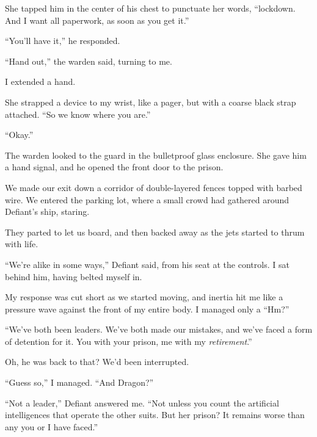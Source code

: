 She tapped him in the center of his chest to punctuate her words, ``\ldotsbefore lockdown.  And I want all paperwork, as soon as you get it.''



``You'll have it,'' he responded.



``Hand out,'' the warden said, turning to me.



I extended a hand.



She strapped a device to my wrist, like a pager, but with a coarse black strap attached.  ``So we know where you are.''



``Okay.''



The warden looked to the guard in the bulletproof glass enclosure.  She gave him a hand signal, and he opened the front door to the prison.



We made our exit down a corridor of double-layered fences topped with barbed wire.  We entered the parking lot, where a small crowd had gathered around Defiant's ship, staring.



They parted to let us board, and then backed away as the jets started to thrum with life.



``We're alike in some ways,'' Defiant said, from his seat at the controls.  I sat behind him, having belted myself in.



My response was cut short as we started moving, and inertia hit me like a pressure  wave against the front of my entire body.  I managed only a ``Hm?''



``We've both been leaders.  We've both made our mistakes, and we've faced a form of detention for it.  You with your prison, me with my \emph{retirement}.''



Oh, he was back to that?  We'd been interrupted.



``Guess so,'' I managed.  ``And Dragon?''



``Not a leader,'' Defiant answered me.  ``Not unless you count the artificial intelligences that operate the other suits.  But her prison?  It remains worse than any you or I have faced.''



